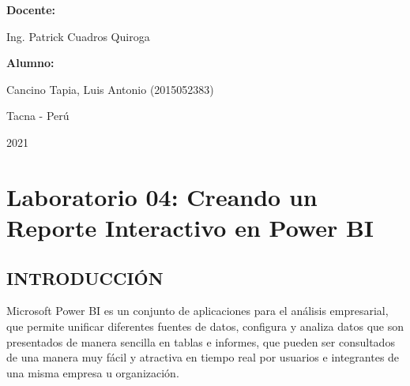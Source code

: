 \documentclass[12pt,letterpaper]{article}
\begin{document}
\begin{titlepage}
\begin{center}
\vspace*{0.3in}
\begin{Large}
\textbf{Docente:} \\
\end{Large}

\vspace*{0.1in}
\begin{large}
Ing. Patrick Cuadros Quiroga\\
\end{large}

\vspace*{0.2in}
\vspace*{0.1in}
\begin{large}
\textbf{Alumno:} \\
\begin{flushleft}
    Cancino Tapia, Luis Antonio		\hfill	(2015052383) \\


\end{flushleft}
\end{large}
\vspace*{0.1in}
\begin{large}
Tacna - Perú\\
\end{large}
\vspace*{0.1in}
\begin{large}
2021\\
\end{large}

\end{center}

\end{titlepage}




\thispagestyle{empty} %
\newpage
\setcounter{page}{1} %



\section*{Laboratorio 04: Creando un Reporte Interactivo en Power BI}
\subsection*{INTRODUCCIÓN} 
Microsoft Power BI es un conjunto de aplicaciones para el análisis empresarial, que permite unificar diferentes fuentes de datos, configura y analiza datos que son presentados de manera sencilla en tablas e informes, que pueden ser consultados de una manera muy fácil y atractiva en tiempo real por usuarios e integrantes de una misma empresa u organización.
\end{document}
